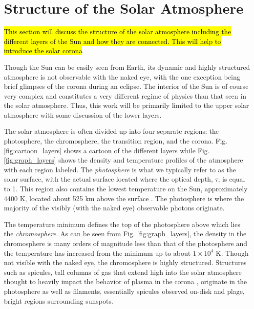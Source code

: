 \section{Structure of the Solar Atmosphere}
\label{sec:structure}
\hl{This section will discuss the structure of the solar atmosphere including the different layers of the Sun and how they are connected. This will help to introduce the solar corona}
\par Though the Sun can be easily seen from Earth, its dynamic and highly structured atmosphere is not observable with the naked eye, with the one exception being brief glimpses of the corona during an eclipse. The interior of the Sun is of course very complex and constitutes a very different regime of physics than that seen in the solar atmosphere. Thus, this work will be primarily limited to the upper solar atmosphere with some discussion of the lower layers.
%
\par The solar atmosphere is often divided up into four separate regions: the photosphere, the chromosphere, the transition region, and the corona. Fig. \ref{fig:cartoon_layers} shows a cartoon of the different layers while Fig. \ref{fig:graph_layers} shows the density and temperature profiles of the atmosphere with each region labeled. The \textit{photosphere} is what we typically refer to as the solar surface, with the actual surface located where the optical depth, $\tau$, is equal to 1. This region also contains the lowest temperature on the Sun, approximately 4400 K, located about 525 km above the surface \citep{carroll_introduction_2007}. The photosphere is where the majority of the visibly (with the naked eye) observable photons originate.
%
\par The temperature minimum defines the top of the photosphere above which lies the \textit{chromosphere}. As can be seen from Fig. \ref{fig:graph_layers}, the density in the chromosphere is many orders of magnitude less than that of the photosphere and the temperature has increased from the minimum up to about $1\times10^4$ K. Though not visible with the naked eye, the chromosphere is highly structured. Structures such as spicules, tall columns of gas that extend high into the solar atmosphere thought to heavily impact the behavior of plasma in the corona \citep{de_pontieu_origins_2011}, originate in the photosphere as well as filaments, essentially spicules observed on-disk and plage, bright regions surrounding sunspots.
%
